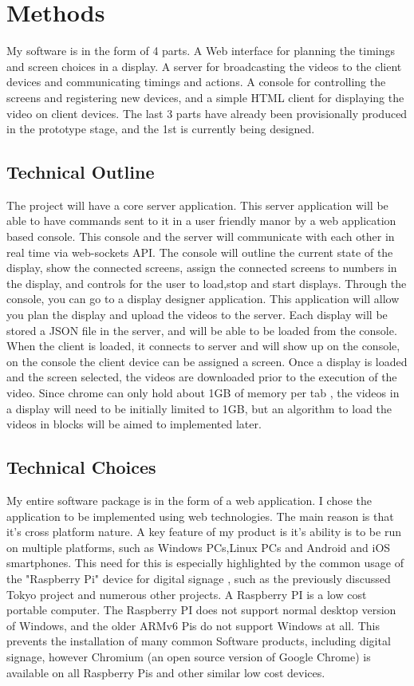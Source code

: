 \documentclass{article}
\begin{document}
\section{Methods}
My software is in the form of 4 parts. A Web interface for planning the timings and screen choices in a display. A server for broadcasting the videos to the client devices and communicating timings and actions. A console for controlling the screens and registering new devices, and a simple HTML client for displaying the video on client devices. The last 3 parts have already been provisionally produced  in the prototype stage, and the 1st is currently being designed.

\subsection{Technical Outline}
The project will have a core server application. This server application will be able to have commands sent to it in a user friendly manor by a web application based console. This console and the server will communicate with each other in real time via web-sockets API. The console will outline the current state of the display, show the connected screens, assign the connected screens to numbers in the display, and controls for the user to load,stop and start displays. Through the console, you can go to a display designer application. This application will allow you plan the display and upload the videos to the server. Each display will be stored a JSON file in the server, and will be able to be loaded from the console. When the client is loaded, it connects to server and will show up on the console, on the console the client device can be assigned a screen. Once a display is loaded and the screen selected, the videos are downloaded prior to the execution of the video. Since chrome can only hold about 1GB of memory per tab , the videos in a display will need to be initially limited to 1GB, but an algorithm to load the videos in blocks will be aimed to implemented later.

\subsection{Technical Choices}
My entire software package is in the form of a web application. I chose the application to be implemented using web technologies. The main reason is that it's cross platform nature. A key feature of my product is it's ability is to be run on multiple platforms, such as Windows PCs,Linux PCs and Android and iOS smartphones. This need for this is especially highlighted by the common usage of the "Raspberry Pi" device for digital signage , such as the previously discussed Tokyo project \cite{tokyo} and numerous other projects\cite{bandung2015design}\cite{arsan2014design}\cite{mishima2016cost}\cite{alase2017iot}. A Raspberry PI is a low cost portable computer. The Raspberry PI does not support normal desktop version of Windows, and the older ARMv6 Pis do not support Windows at all. This prevents the installation of many common Software products, including digital signage, however Chromium (an open source version of Google Chrome) is available on all Raspberry Pis and other similar low cost devices.  
\end{document}
